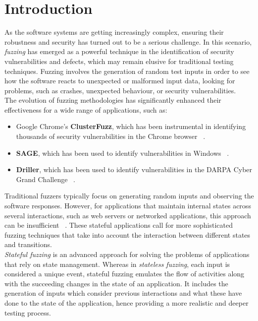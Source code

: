 \chapter{Introduction}

As the software systems are getting increasingly complex, ensuring their robustness and security has turned out to be a serious challenge. In this scenario, \textit{fuzzing} has emerged as a powerful technique in the identification of security vulnerabilities and defects, which may remain elusive for traditional testing techniques. Fuzzing involves the generation of random test inputs in order to see how the software reacts to unexpected or malformed input data, looking for problems, such as crashes, unexpected behaviour, or security vulnerabilities.
\\The evolution of fuzzing methodologies has significantly enhanced their effectiveness for a wide range of applications, such as:
\begin{itemize}
    \item Google Chrome's \textbf{ClusterFuzz}, which has been instrumental in identifying thousands of security vulnerabilities in the Chrome browser ~\cite{ossfuzz}.
    \item \textbf{SAGE}, which has been used to identify vulnerabilities in Windows ~\cite{sage}.
    \item \textbf{Driller}, which has been used to identify vulnerabilities in the DARPA Cyber Grand Challenge ~\cite{driller}.
\end{itemize}
Traditional fuzzers typically focus on generating random inputs and observing the software responses. However, for applications that maintain internal states across several interactions, such as web servers or networked applications, this approach can be insufficient ~\cite{statefulfuzzingchallenges}. These stateful applications call for more sophisticated fuzzing techniques that take into account the interaction between different states and transitions.
\\\textit{Stateful fuzzing} is an advanced approach for solving the problems of applications that rely on state management. Whereas in \textit{stateless fuzzing}, each input is considered a unique event, stateful fuzzing emulates the flow of activities along with the succeeding changes in the state of an application. It includes the generation of inputs which consider previous interactions and what these have done to the state of the application, hence providing a more realistic and deeper testing process.
